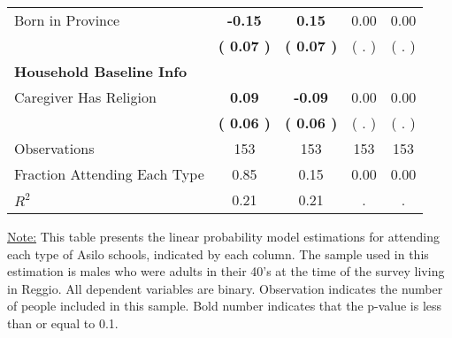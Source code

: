 \begin{table}[H]
{\begin{tabular}{lcccc}
\quad Born in Province & \textbf{    -0.15} & \textbf{     0.15} &      0.00 &      0.00 \\
\quad  & \textbf{(     0.07 )} & \textbf{(     0.07 )}  & (        . )  & (        . )  \\
\midrule
\textbf{Household Baseline Info} \\
\quad Caregiver Has Religion & \textbf{     0.09} & \textbf{    -0.09} &      0.00 &      0.00 \\
\quad  & \textbf{(     0.06 )} & \textbf{(     0.06 )}  & (        . )  & (        . )  \\
\midrule
Observations & 153 & 153 & 153 & 153 \\
Fraction Attending Each Type &      0.85 &      0.15 &      0.00 &      0.00 \\
\midrule
$ R^2$ &      0.21 &      0.21 &         . &         . \\
\bottomrule
\end{tabular}}
\end{table}
\begin{footnotesize}
\noindent\underline{Note:} This table presents the linear probability model estimations for attending each type of Asilo schools, indicated by each column. The sample used in this estimation is males who were adults in their 40's at the time of the survey living in Reggio. All dependent variables are binary. Observation indicates the number of people included in this sample. Bold number indicates that the p-value is less than or equal to 0.1.
\end{footnotesize}
